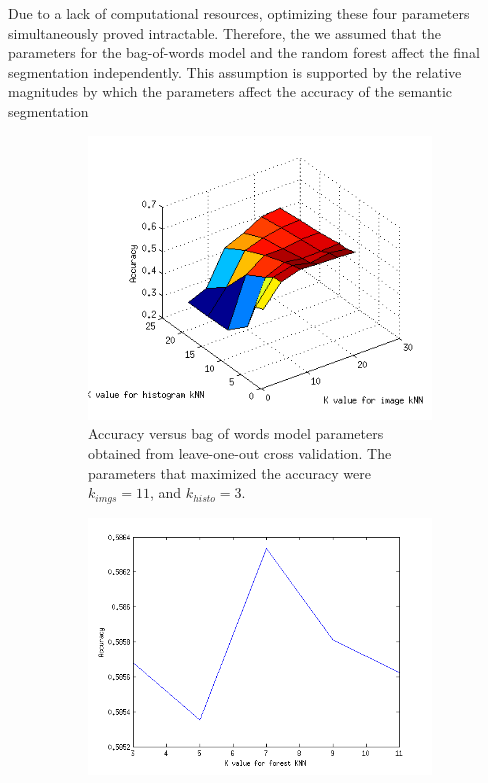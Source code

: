 \documentclass{article} %
\begin{document}
Due to a lack of computational resources, optimizing these four parameters simultaneously proved intractable. Therefore, the we assumed that the parameters for the bag-of-words model and the random forest affect the final segmentation independently. This assumption is supported by the relative magnitudes by which the parameters affect the accuracy of the semantic segmentation

\begin{figure}[htb]
\centering
	\begin{subfigure}[t]{0.33\textwidth}
		\centering
		\includegraphics[width = \textwidth]{./img/pickK3}
		\parbox{.95\textwidth}{\caption{Accuracy versus bag of words model parameters obtained from leave-one-out cross validation. The parameters that maximized the accuracy were $k_{imgs} = 11$, and $k_{histo} = 3$. \label{fig:Kbag} }}
			\end{subfigure}
	\begin{subfigure}[t]{0.33\textwidth}
		\centering
		\includegraphics[width = \textwidth]{./img/kforest}

\end{subfigure}
\end{figure}
\end{document}
